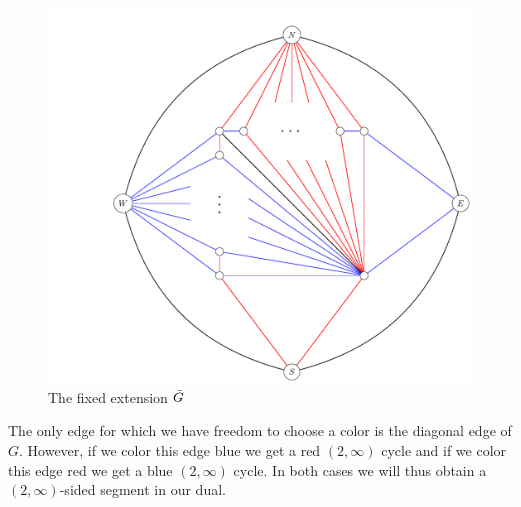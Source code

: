   \begin{figure}[h!]
  \centering
  \includegraphics[scale=.5]{fixExtension/img/2manysidedLowerBound}

  \caption{The fixed extension $\bar{G}$
      \label{fig:2manysidedLowerBound}}
  \end{figure}

  The only edge for which we have freedom to choose a color is the diagonal edge of $G$. However, if we color this edge blue we get a red $(2, \infty)$ cycle and if we color this edge red we get a blue $(2, \infty)$ cycle. In both cases we will thus obtain a $(2,\infty)$-sided segment in our dual.
